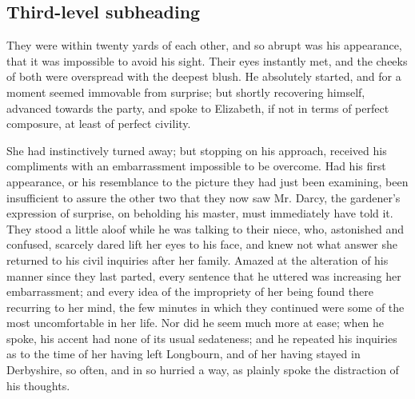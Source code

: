 \subsection{Third-level subheading}

They were within twenty yards of each other, and so abrupt was his appearance, that it was impossible to avoid his sight. Their eyes instantly met, and the cheeks of both were overspread with the deepest blush. He absolutely started, and for a moment seemed immovable from surprise; but shortly recovering himself, advanced towards the party, and spoke to Elizabeth, if not in terms of perfect composure, at least of perfect civility.

She had instinctively turned away; but stopping on his approach, received his compliments with an embarrassment impossible to be overcome. Had his first appearance, or his resemblance to the picture they had just been examining, been insufficient to assure the other two that they now saw Mr. Darcy, the gardener's expression of surprise, on beholding his master, must immediately have told it. They stood a little aloof while he was talking to their niece, who, astonished and confused, scarcely dared lift her eyes to his face, and knew not what answer she returned to his civil inquiries after her family. Amazed at the alteration of his manner since they last parted, every sentence that he uttered was increasing her embarrassment; and every idea of the impropriety of her being found there recurring to her mind, the few minutes in which they continued were some of the most uncomfortable in her life. Nor did he seem much more at ease; when he spoke, his accent had none of its usual sedateness; and he repeated his inquiries as to the time of her having left Longbourn, and of her having stayed in Derbyshire, so often, and in so hurried a way, as plainly spoke the distraction of his thoughts.

